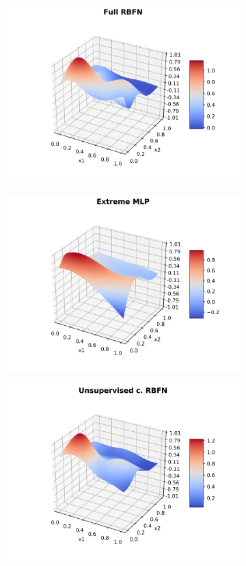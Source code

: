 \documentclass[a4paper]{article}
\numberwithin{equation}{section} %
\numberwithin{figure}{section} %
\numberwithin{table}{section} %
\theoremstyle{definition}
\begin{document}
\begin{figure}[H]
\begin{subfigure}{.32\textwidth}
		\includegraphics[width=1.0\linewidth]{images/RBFN_N_70_sigma_025_rho_1e-05.png}
	\end{subfigure}
	\begin{subfigure}{.32\textwidth}
		\centering
		\includegraphics[width=1.0\linewidth]{images/MLP_Extreme_Learning.png}
	\end{subfigure}
	\begin{subfigure}{.32\textwidth}
		\centering
		\includegraphics[width=1.0\linewidth]{images/RBFN_Extreme_Learning.png}

\end{subfigure}
\end{figure}
\end{document}
